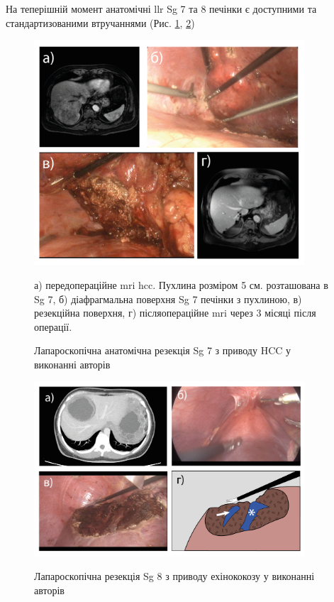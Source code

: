 \begin{refsection}
На теперішній момент анатомічні \acrshort{llr} Sg 7 та 8 печінки є доступними та стандартизованими втручаннями (Рис. \ref{fig:Complex_localisation_Sg7}, \ref{fig:Complex_localisation_Sg8}) 


\begin{figure}[h]
\caption{Лапароскопічна анатомічна резекція Sg 7 з приводу HCC у виконанні авторів}

\includegraphics[width=0.9\textwidth]{Illustrations/Chapter_01/Complex_localisation_Sg7.png}
\label{fig:Complex_localisation_Sg7}

\medskip
\small
а) передопераційне \acrshort{mri} \acrshort{hcc}. Пухлина розміром 5 см. розташована в Sg 7,  б) діафрагмальна поверхня Sg 7 печінки з пухлиною, в) резекційна поверхня, г) післяопераційне \acrshort{mri} через 3 місяці після операції.

\end{figure}


\begin{figure}[h]
\caption{Лапароскопічна резекція Sg 8 з приводу ехінококозу у виконанні авторів}

\includegraphics[width=0.9\textwidth]{Illustrations/Chapter_01/Complex_localisation_Sg8.png}
\label{fig:Complex_localisation_Sg8}


\end{figure}
\end{refsection}
